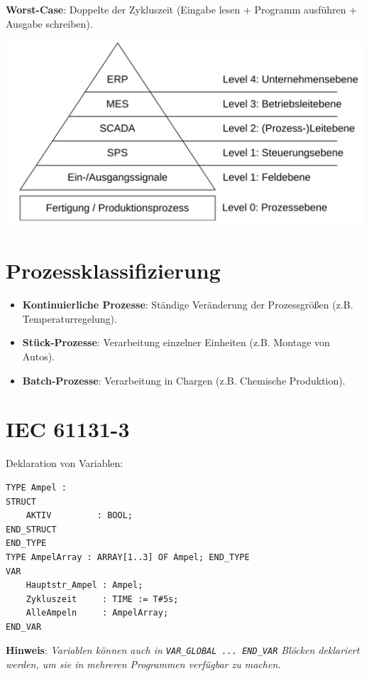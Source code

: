 \documentclass[9pt, landscape]{article}
\newcommand{\algo}[1]{\textbf{\textcolor{blue!60!black}{#1}}}
\newcommand{\datastruct}[1]{\textbf{\textcolor{red!60!black}{#1}}}
\begin{document}
\begin{multicols*}{4}
\algo{Worst-Case}: Doppelte der Zykluszeit (Eingabe lesen + Programm ausführen + Ausgabe schreiben).

\begin{center}
    \includegraphics[width=0.8\linewidth]{assets/ATP.png}
\end{center}

\section{Prozessklassifizierung}

\begin{itemize}
    \item \datastruct{Kontinuierliche Prozesse}: Ständige Veränderung der Prozessgrößen (z.B. Temperaturregelung).
    \item \datastruct{Stück-Prozesse}: Verarbeitung einzelner Einheiten (z.B. Montage von Autos).
    \item \datastruct{Batch-Prozesse}: Verarbeitung in Chargen (z.B. Chemische Produktion).
\end{itemize}

\section{IEC 61131-3}
Deklaration von Variablen:

\begin{lstlisting}[language=ST, numbers=none]
TYPE Ampel :
STRUCT
    AKTIV         : BOOL;
END_STRUCT
END_TYPE
TYPE AmpelArray : ARRAY[1..3] OF Ampel; END_TYPE
VAR
    Hauptstr_Ampel : Ampel;
    Zykluszeit     : TIME := T#5s;
    AlleAmpeln     : AmpelArray;
END_VAR
\end{lstlisting}

\algo{Hinweis}: \textit{Variablen können auch in \lstinline|VAR_GLOBAL ... END_VAR| Blöcken deklariert werden, um sie in mehreren Programmen verfügbar zu machen.}


\end{multicols*}
\end{document}
